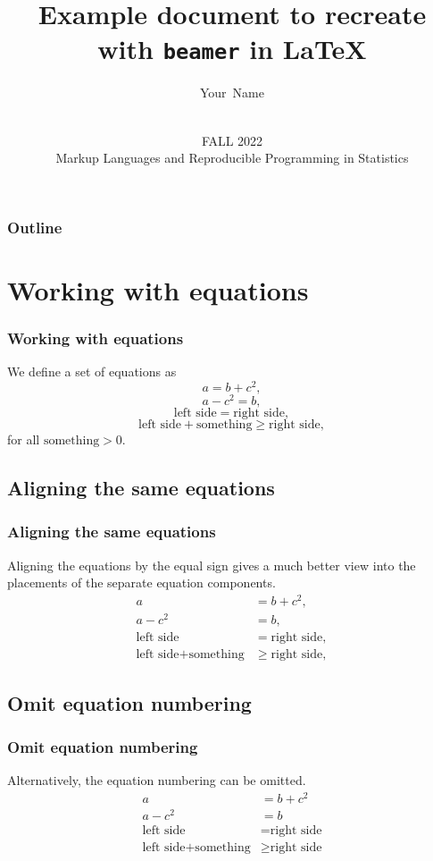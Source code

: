 \documentclass[aspectratio=169]{beamer} %
\title[Example] {Example document to recreate with \texttt{beamer} in \LaTeX}
\author[Your Name]
{
 Your~Name
}
\date[MLRPS]
{\vspace{.5 in}\\ FALL 2022 \\ Markup Languages and Reproducible Programming in Statistics  \vskip6mm}
\begin{document}
\titlepage

\begin{frame}
\frametitle{Outline}
\tableofcontents
\end{frame}

\section{Working with equations}
\begin{frame}
\frametitle{Working with equations}
    We define a set of equations as
    \begin{equation}
        a=b+c^2,
    \end{equation}
    \begin{equation}
    	a-c^2=b,
    \end{equation}
    \begin{equation}
    	\text{left side} = \text{right side},
    \end{equation}
    \begin{equation}
    	\text{left side} + \text{something} \geq \text{right side},
    \end{equation}
    for all $\text{something} > 0$. 
\end{frame}

\subsection{Aligning the same equations}
\begin{frame}
\frametitle{Aligning the same equations}
    Aligning the equations by the equal sign gives a much better view into the placements of the separate equation components. 
    \begin{align}
    	a&=b+c^2,\\
    	a-c^2&=b,\\
    	\text{left side} &= \text{right side},\\
    	\text{left side} + \text{something} & \geq \text{right side},
    \end{align}
\end{frame}

\subsection{Omit equation numbering}
\begin{frame}
\frametitle{Omit equation numbering}
    Alternatively, the equation numbering can be omitted. 
    \begin{align*}
    	a&=b+c^2\\
    	a-c^2&=b\\
    	\text{left side} &= \text{right side}\\
    	\text{left side} + \text{something} & \geq \text{right side}
    \end{align*}
\end{frame}
\end{document}
